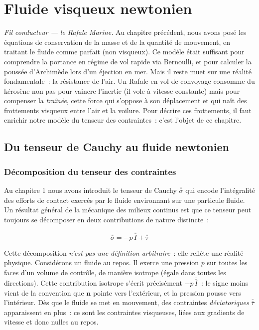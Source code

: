 \documentclass[11pt,a4paper]{report}
\newcommand{\ten}[1]{\overline{\overline{#1}}}   %
\begin{document}
\chapter{Fluide visqueux newtonien}

\noindent
\textit{Fil conducteur --- le Rafale Marine.}
Au chapitre précédent, nous avons posé les équations de conservation de la masse
et de la quantité de mouvement, en traitant le fluide comme parfait (non visqueux).
Ce modèle était suffisant pour comprendre la portance en régime de vol rapide via
Bernoulli, et pour calculer la poussée d'Archimède lors d'un éjection en mer.
Mais il reste muet sur une réalité fondamentale~: la résistance de l'air.
Un Rafale en vol de convoyage consomme du kérosène non pas pour vaincre l'inertie
(il vole à vitesse constante) mais pour compenser la \emph{traînée}, cette force
qui s'oppose à son déplacement et qui naît des frottements visqueux entre l'air et
la voilure. Pour décrire ces frottements, il faut enrichir notre modèle du tenseur
des contraintes~: c'est l'objet de ce chapitre.

\section{Du tenseur de Cauchy au fluide newtonien}

\subsection{Décomposition du tenseur des contraintes}

Au chapitre 1 nous avons introduit le tenseur de Cauchy $\ten{\sigma}$ qui encode
l'intégralité des efforts de contact exercés par le fluide environnant sur une
particule fluide. Un résultat général de la mécanique des milieux continus est que
ce tenseur peut toujours se décomposer en deux contributions de nature distincte~:

\begin{equation}
    \ten{\sigma} = -p\,\ten{I} + \ten{\tau}
    \label{eq:decomp_sigma}
\end{equation}

Cette décomposition \emph{n'est pas une définition arbitraire}~: elle reflète une
réalité physique. Considérons un fluide au repos. Il exerce une pression $p$ sur
toutes les faces d'un volume de contrôle, de manière isotrope (égale dans toutes
les directions). Cette contribution isotrope s'écrit précisément $-p\,\ten{I}$~: le
signe moins vient de la convention que $\bm{n}$ pointe vers l'extérieur, et la
pression pousse vers l'intérieur. Dès que le fluide se met en mouvement, des
contraintes \emph{déviatoriques} $\ten{\tau}$ apparaissent en plus~: ce sont les
contraintes visqueuses, liées aux gradients de vitesse et donc nulles au repos.
\end{document}

